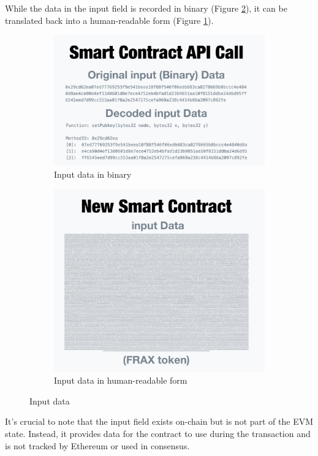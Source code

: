 \documentclass[fleqn,10pt]{olplainarticle}
\begin{document}
While the data in the input field is recorded in binary (Figure \ref{fig:newsc}), it can be translated back into a human-readable form (Figure \ref{fig:scapicall}).

\begin{figure}
	\begin{subfigure}{.5\textwidth}
		\centering
		\includegraphics[width=0.8\linewidth]{img/scAPICall}
		\caption{Input data in binary}
		\label{fig:scapicall}
	\end{subfigure}
	\begin{subfigure}{.5\textwidth}
		\centering
		\includegraphics[width=0.8\linewidth]{img/NewSC}
		\caption{Input data in human-readable form }
		\label{fig:newsc}
	\end{subfigure}
	\caption{Input data \cite{kirshner_ethereumTx_2023}}
	\label{fig:inputIMG}
\end{figure}

It's crucial to note that the input field exists on-chain but is not part of the EVM state. Instead, it provides data for the contract to use during the transaction and is not tracked by Ethereum or used in consensus.
\end{document}
